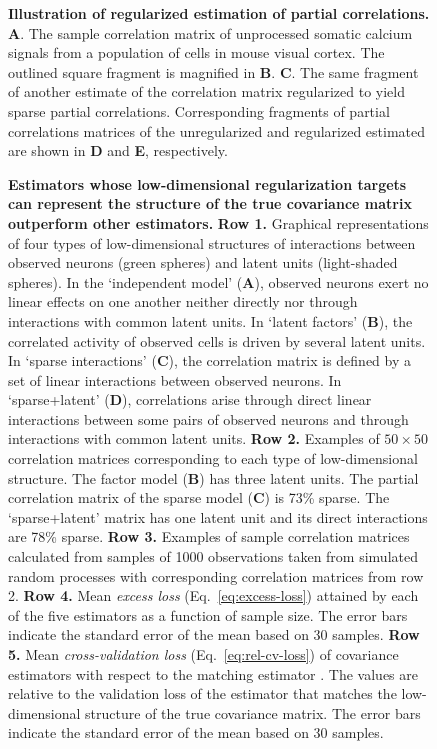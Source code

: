 \documentclass[10pt]{article}
\begin{document}
\begin{figure}[!ht]
    \begin{center}
    \end{center}
    \caption{{\bf Illustration of regularized estimation of partial correlations.}
        {\bf A}. The sample correlation matrix of unprocessed somatic calcium signals from a population of cells in mouse visual cortex.
        The outlined square fragment is magnified in {\bf B}.
        {\bf C}. The same fragment of another estimate of the correlation matrix regularized to yield sparse partial correlations.
        Corresponding fragments of partial correlations matrices of the unregularized and regularized estimated are shown in {\bf D} and {\bf E}, respectively.
    }
    \label{fig:01}
\end{figure}

\begin{figure}[!ht]
    \begin{center}
    \end{center}
    \caption{{\bf Estimators whose low-dimensional regularization targets can represent the structure of the true covariance matrix outperform other estimators.}
        {\bf Row 1.} Graphical representations of four types of low-dimensional structures of interactions between observed neurons (green spheres) and latent units (light-shaded spheres).
        In the `independent model' ({\bf A}), observed neurons exert no linear effects on one another neither directly nor through interactions with common latent units. 
        In `latent factors' ({\bf B}), the correlated activity of observed cells is driven by several latent units. 
        In `sparse interactions' ({\bf C}), the correlation matrix is defined by a set of linear interactions between observed neurons. 
        In `sparse+latent' ({\bf D}), correlations arise through direct linear interactions between some pairs of observed neurons and through interactions with common latent units. 
        {\bf Row 2.} Examples of $50\times 50$ correlation matrices corresponding to each type of low-dimensional structure. 
        The factor model ({\bf B}) has three latent units. 
        The partial correlation matrix of the sparse model ({\bf C}) is 73\% sparse.
        The `sparse+latent' matrix has one latent unit and its direct interactions are 78\% sparse.
        {\bf Row 3.} Examples of sample correlation matrices calculated from samples of 1000 observations taken from simulated random processes with corresponding correlation matrices from row 2.
        {\bf Row 4.} Mean \emph{excess loss} (Eq.~\ref{eq:excess-loss}) attained by each of the five estimators as a function of sample size. The error bars indicate the standard error of the mean based on 30 samples.
        {\bf Row 5.} Mean \emph{cross-validation loss} (Eq.~\ref{eq:rel-cv-loss}) of covariance estimators with respect to the matching estimator . The values are relative to the validation loss of the estimator that matches the low-dimensional structure of the true covariance matrix. The error bars indicate the standard error of the mean based on 30 samples.
    }
    \label{fig:02}
\end{figure} 
\end{document}
